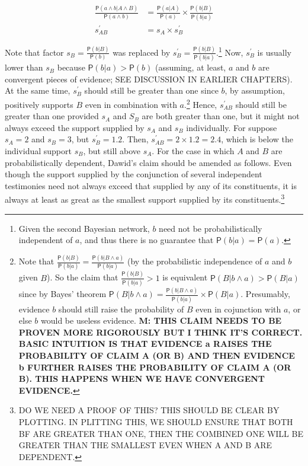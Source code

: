 \documentclass[10pt,dvipsnames,enabledeprecatedfontcommands]{scrartcl}
\newcommand{\pr}[1]{\mathsf{P}(#1)}
\begin{document}
\begin{align*}
\frac{\pr{a \wedge b| A\wedge B}}{\pr{a \wedge b}} & =  \frac{\pr{a |A}}{\pr{a}} \times \frac{\pr{b |B}}{\pr{b|a}} \\
s^{'}_{AB}& =  s_{A}\times s^{'}_{B} 
 \end{align*}

\noindent  Note that factor \(s_{B}= \frac{\pr{b |B}}{\pr{b}}\) was
replaced by
\(s^{'}_{B}=\frac{\pr{b |B}}{\pr{b|a}}\).\footnote{Given the second Bayesian network, 
$b$ need not be probabilistically independent of $a$, and thus there is no guarantee that 
$\pr{b \vert a}=\pr{a}$.} Now, \(s^{'}_{B}\) is usually lower than
\(s_{B}\) because \(\pr{b | a} > \pr{b}\) (assuming, at least, \(a\) and
\(b\) are convergent pieces of evidence; SEE DISCUSSION IN EARLIER
CHAPTERS). At the same time, \(s^{'}_{B}\) should still be greater than
one since \(b\), by assumption, positively supports \(B\) even in
combination with \(a\).\footnote{Note that 
$\frac{\pr{b |B}}{\pr{b|a}}=\frac{\pr{b |B \wedge a}}{\pr{b|a}}$ 
(by the probabilistic independence of $a$ and $b$ given $B$). 
So the claim that $\frac{\pr{b |B}}{\pr{b|a}}>1$ is 
equivalent $\pr{B | b \wedge a}> \pr{B|a}$ since by Bayes' theorem 
$\pr{B | b \wedge a} = \frac{\pr{b |B \wedge a}}{\pr{b|a}} \times \pr{B|a}$.
Presumably, evidence $b$ should still raise the probability of $B$ 
even in cojunction with $a$, or else $b$ would be useless evidence. \textbf{M: THIS CLAIM NEEDS 
TO BE PROVEN MORE RIGOROUSLY BUT I THINK IT'S CORRECT. BASIC INTUITION IS THAT EVIDENCE a 
RAISES THE PROBABILITY OF CLAIM A (OR B) AND THEN EVIDENCE 
b FURTHER RAISES THE PROBABILITY OF CLAIM A (OR B). THIS HAPPENS WHEN WE HAVE CONVERGENT 
EVIDENCE.}} Hence, \(s^{'}_{AB}\) should still be greater than one
provided \(s_A\) and \(S_B\) are both greater than one, but it might not
always exceed the support supplied by \(s_A\) and \(s_B\) individually.
For suppose \(s_A=2\) and \(s_B=3\), but \(s^{'}_B=1.2\). Then,
\(s^{'}_{AB}=2\times 1.2=2.4\), which is below the individual support
\(s_B\), but still above \(s_A\). For the case in which \(A\) and \(B\)
are probabilistically dependent, Dawid's claim should be amended as
follows. Even though the support supplied by the conjunction of several
independent testimonies need not always exceed that supplied by any of
its constituents, it is always at least as great as the smallest support
supplied by its
constituents.\footnote{DO WE NEED A PROOF OF THIS? THIS SHOULD BE CLEAR BY PLOTTING. IN PLITTING THIS, WE SHOULD ENSURE THAT BOTH BF ARE GREATER THAN ONE, THEN THE COMBINED ONE WILL BE GREATER THAN THE SMALLEST EVEN WHEN A AND B ARE DEPENDENT.}
\end{document}
